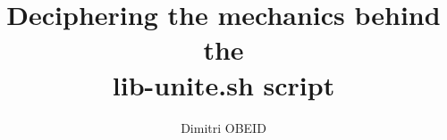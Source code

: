 \documentclass[a4paper,10pt]{article}
\title{\color{sec1}Deciphering the mechanics behind the \\ \textbf{\color{sec2}lib-unite.sh} script}\color{text}
\author{Dimitri OBEID}
\begin{document}
    \maketitle
    \newpage

    \hypertarget{contents}{}
    \tableofcontents
    \newpage

    \color{sec1}
    \section{}\color{text}




\end{document}
